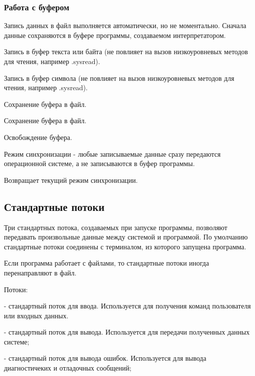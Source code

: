\subsubsection*{Работа с буфером}

Запись данных в файл выполняется автоматически, но не моментально. Сначала данные сохраняются в буфере программы, создаваемом интерпретатором.

\begin{methodlist}
  Запись в буфер текста или байта (не повлияет на вызов низкоуровневых методов для чтения, например .sysread).

  Запись в буфер символа (не повлияет на вызов низкоуровневых методов для чтения, например .sysread). 

  Сохранение буфера в файл. 

  Сохранение буфера в файл. 

  Освобождение буфера.

  Режим синхронизации - любые записываемые данные сразу передаются операционной системе, а не записываются в буфер программы. 

  Возвращает текущий режим синхронизации.
\end{methodlist}

\subsection{Стандартные потоки}

Три стандартных потока, создаваемых при запуске программы, позволяют передавать произвольные данные между системой и программой. По умолчанию стандартные потоки соединены с терминалом, из которого запущена программа.

Если программа работает с файлами, то стандартные потоки иногда перенаправляют в файл.

\begin{keylist}{Потоки:}
  
   - стандартный поток для ввода. Используется для получения команд пользователя или входных данных.

   - стандартный поток для вывода. Используется для передачи полученных данных системе; 
  
   - стандартный поток для вывода ошибок. Используется для вывода диагностичеких и отладочных сообщений;
\end{keylist}

